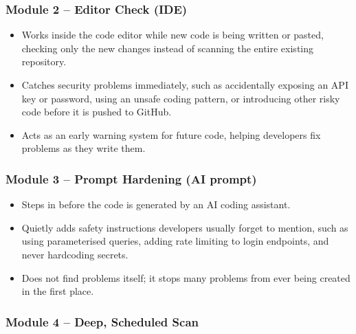 \documentclass[11pt,a4paper]{article}
\begin{document}
\subsubsection{Module 2 -- Editor Check (IDE)}

\begin{itemize}[leftmargin=0.7cm]

    \item Works inside the code editor while new code is being written or pasted, checking only the new changes instead of scanning the entire existing repository.

    \item Catches security problems immediately, such as accidentally exposing an API key or password, using an unsafe coding pattern, or introducing other risky code before it is pushed to GitHub.

    \item Acts as an early warning system for future code, helping developers fix problems as they write them.

\end{itemize}

\subsubsection{Module 3 -- Prompt Hardening (AI prompt)}

\begin{itemize}[leftmargin=0.7cm]

    \item Steps in before the code is generated by an AI coding assistant.

    \item Quietly adds safety instructions developers usually forget to mention, such as using parameterised queries, adding rate limiting to login endpoints, and never hardcoding secrets.

    \item Does not find problems itself; it stops many problems from ever being created in the first place.

\end{itemize}

\subsubsection{Module 4 -- Deep, Scheduled Scan}
\end{document}
